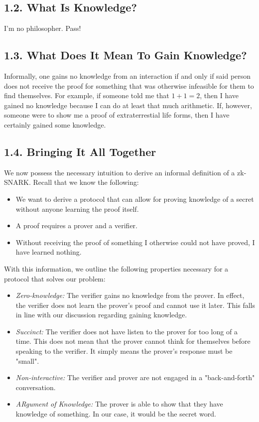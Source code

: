\documentclass{article}
\begin{document}
\subsection*{1.2. What Is Knowledge?}
I'm no philosopher. Pass!
\subsection*{1.3. What Does It Mean To Gain Knowledge?}
Informally, one gains no knowledge from an interaction if and only if said person does not receive the proof for something that was otherwise infeasible for them to find themselves. For example, if someone told me that $1 + 1 = 2$, then I have gained no knowledge because I can do at least that much arithmetic. If, however, someone were to show me a proof of extraterrestial life forms, then I have certainly gained some knowledge.
\subsection*{1.4. Bringing It All Together}
We now possess the necessary intuition to derive an informal definition of a zk-SNARK. Recall that we know the following:
\begin{itemize}
    \item We want to derive a protocol that can allow for proving knowledge of a secret without anyone learning the proof itself.
    \item A proof requires a prover and a verifier.
    \item Without receiving the proof of something I otherwise could not have proved, I have learned nothing.
\end{itemize}
With this information, we outline the following properties necessary for a protocol that solves our problem:
\begin{itemize}
    \item \textit{Zero-knowledge:} The verifier gains no knowledge from the prover. In effect, the verifier does not learn the prover's proof and cannot use it later. This falls in line with our discussion regarding gaining knowledge.
    \item \textit{Succinct:} The verifier does not have listen to the prover for too long of a time. This does not mean that the prover cannot think for themselves before speaking to the verifier. It simply means the prover's response must be "small".
    \item \textit{Non-interactive:} The verifier and prover are not engaged in a "back-and-forth" conversation.
    \item \textit{ARgument of Knowledge:} The prover is able to show that they have knowledge of something. In our case, it would be the secret word.
\end{itemize}
\end{document}

